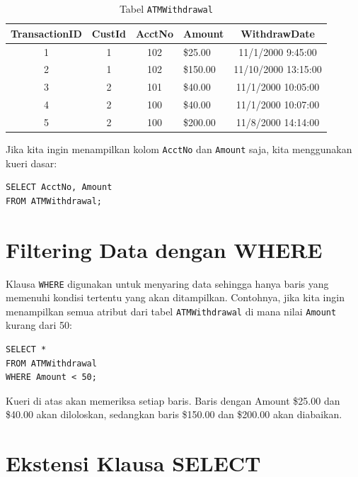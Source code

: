 \documentclass[11pt,a4paper]{article}
\begin{document}
\begin{table}[H]
	\centering
	\small
	\caption{Tabel \texttt{ATMWithdrawal}}
	\begin{tabularx}{0.9\textwidth}{@{} c c c X c @{}}
		\toprule
		\textbf{TransactionID} & \textbf{CustId} & \textbf{AcctNo} & \textbf{Amount} & \textbf{WithdrawDate} \\
		\midrule
		1                      & 1               & 102             & \$25.00         & 11/1/2000 9:45:00     \\
		2                      & 1               & 102             & \$150.00        & 11/10/2000 13:15:00   \\
		3                      & 2               & 101             & \$40.00         & 11/1/2000 10:05:00    \\
		4                      & 2               & 100             & \$40.00         & 11/1/2000 10:07:00    \\
		5                      & 2               & 100             & \$200.00        & 11/8/2000 14:14:00    \\
		\bottomrule
	\end{tabularx}
\end{table}

Jika kita ingin menampilkan kolom \texttt{AcctNo} dan \texttt{Amount} saja, kita menggunakan kueri dasar:
\begin{lstlisting}
SELECT AcctNo, Amount
FROM ATMWithdrawal;
\end{lstlisting}

\section{Filtering Data dengan WHERE}

Klausa \texttt{WHERE} digunakan untuk menyaring data sehingga hanya baris yang memenuhi kondisi tertentu yang akan ditampilkan. Contohnya, jika kita ingin menampilkan semua atribut dari tabel \texttt{ATMWithdrawal} di mana nilai \texttt{Amount} kurang dari 50:

\begin{lstlisting}
SELECT *
FROM ATMWithdrawal
WHERE Amount < 50;
\end{lstlisting}
Kueri di atas akan memeriksa setiap baris. Baris dengan Amount \$25.00 dan \$40.00 akan diloloskan, sedangkan baris \$150.00 dan \$200.00 akan diabaikan.

\section{Ekstensi Klausa SELECT}
\end{document}
